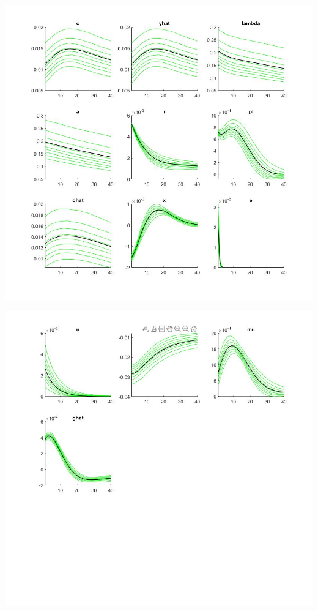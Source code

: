 \documentclass[11pt,preprint, authoryear]{elsarticle}
\let\origfigure\figure
\let\endorigfigure\endfigure
\renewenvironment{figure}[1][2] {
    \expandafter\origfigure\expandafter[H]
} {
    \endorigfigure
}
\numberwithin{equation}{section}
\numberwithin{figure}{section}
\numberwithin{table}{section}
\begin{document}
\begin{figure}
    \centering 
    \begin{minipage}[t]{8.2cm} 
        \centering 
        \includegraphics[width=\linewidth]{flex_fore_mean.jpg} 
    \end{minipage} 
    \hspace{0.1cm} 
    \begin{minipage}[t]{8.2cm} 
        \centering 
        \includegraphics[width=\linewidth]{flex_fore_mean1.jpg} 
    \end{minipage}
    \caption{Forecasted Variables (mean) - Flexible Money Growth Rule}
    \label{flex_mean}
\end{figure}
\end{document}
